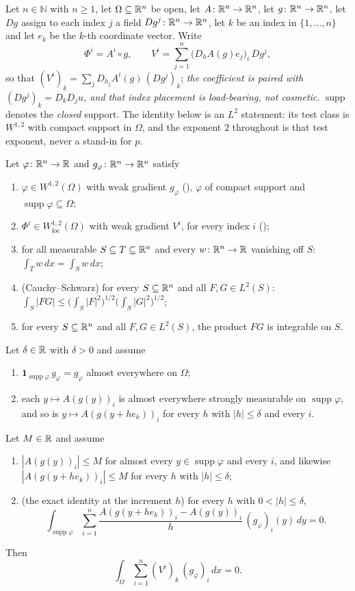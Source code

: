 \begin{helper}
Let $n\in\mathbb{N}$ with $n\ge1$, let $\Omega\subseteq\mathbb{R}^n$ be open, let
$A\colon\mathbb{R}^n\to\mathbb{R}^n$, let $g\colon\mathbb{R}^n\to\mathbb{R}^n$, let $Dg$ assign to each index
$j$ a field $Dg^j\colon\mathbb{R}^n\to\mathbb{R}^n$, let $k$ be an index in $\{1,\dots,n\}$ and
let $e_k$ be the $k$-th coordinate vector.  Write
\[
\Phi^i=A^i\circ g,
\qquad
V^i=\sum_{j=1}^n\bigl(D_hA(g)e_j\bigr)_i\,Dg^j ,
\]
so that $(V^i)_k=\sum_jD_{h_j}A^i(g)\,(Dg^j)_k$; \emph{the coefficient is
paired with $(Dg^j)_k=D_kD_ju$, and that index placement is load-bearing, not
cosmetic}.  $\operatorname{supp}$ denotes the \emph{closed} support.  The
identity below is an $L^2$ statement: its test class is $W^{1,2}$ with compact
support in $\Omega$, and the exponent $2$ throughout is that test exponent,
never a stand-in for $p$.

Let $\varphi\colon\mathbb{R}^n\to\mathbb{R}$ and $g_\varphi\colon\mathbb{R}^n\to\mathbb{R}^n$ satisfy
\begin{enumerate}
\item[(H1)] $\varphi\in W^{1,2}(\Omega)$ with weak gradient $g_\varphi$
  (), $\varphi$ of compact support and
  $\operatorname{supp}\varphi\subseteq\Omega$;
\item[(H2)] $\Phi^i\in W^{1,2}_{\mathrm{loc}}(\Omega)$ with weak gradient
  $V^i$, for every index $i$ ();
\item[(H3)] for all measurable $S\subseteq T\subseteq\mathbb{R}^n$ and every
  $w\colon\mathbb{R}^n\to\mathbb{R}$ vanishing off $S$: $\int_Tw\,dx=\int_Sw\,dx$;
\item[(H4)] (Cauchy--Schwarz) for every $S\subseteq\mathbb{R}^n$ and all
  $F,G\in L^2(S)$:
  $\int_S|FG|\le\bigl(\int_S|F|^2\bigr)^{1/2}\bigl(\int_S|G|^2\bigr)^{1/2}$;
\item[(H5)] for every $S\subseteq\mathbb{R}^n$ and all $F,G\in L^2(S)$, the product
  $FG$ is integrable on $S$.
\end{enumerate}
Let $\delta\in\mathbb{R}$ with $\delta>0$ and assume
\begin{enumerate}
\item[(H6)] $\mathbf1_{\operatorname{supp}\varphi}\,g_\varphi=g_\varphi$ almost
  everywhere on $\Omega$;
\item[(H7)] each $y\mapsto A(g(y))_i$ is almost everywhere strongly measurable
  on $\operatorname{supp}\varphi$, and so is
  $y\mapsto A(g(y+he_k))_i$ for every $h$ with $|h|\le\delta$ and every $i$.
\end{enumerate}
Let $M\in\mathbb{R}$ and assume
\begin{enumerate}
\item[(H8)] $|A(g(y))_i|\le M$ for almost every
  $y\in\operatorname{supp}\varphi$ and every $i$, and likewise
  $|A(g(y+he_k))_i|\le M$ for every $h$ with $|h|\le\delta$;
\item[(H9)] (the exact identity at the increment $h$) for every $h$ with
  $0<|h|\le\delta$,
  \[
  \int_{\operatorname{supp}\varphi}\sum_{i=1}^n
  \frac{A(g(y+he_k))_i-A(g(y))_i}{h}\,(g_\varphi)_i(y)\,dy=0 .
  \]
\end{enumerate}
Then
\[
\int_\Omega\sum_{i=1}^n(V^i)_k\,(g_\varphi)_i\,dx=0 .
\]
\end{helper}
